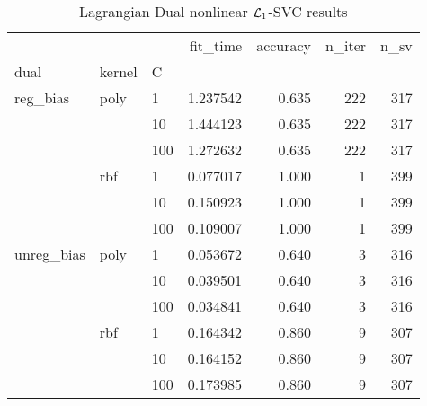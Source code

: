 \begin{table}[H]
\centering
\caption{Lagrangian Dual nonlinear $\protect \mathcal{L}_1$-SVC results}
\label{nonlinear_lagrangian_dual_l1_svc_cv_results}
\begin{tabular}{lllrrrr}
\toprule
           &     &     &  fit\_time &  accuracy &  n\_iter &  n\_sv \\
dual & kernel & C &           &           &         &       \\
\midrule
reg\_bias & poly & 1   &  1.237542 &     0.635 &     222 &   317 \\
           &     & 10  &  1.444123 &     0.635 &     222 &   317 \\
           &     & 100 &  1.272632 &     0.635 &     222 &   317 \\
           & rbf & 1   &  0.077017 &     1.000 &       1 &   399 \\
           &     & 10  &  0.150923 &     1.000 &       1 &   399 \\
           &     & 100 &  0.109007 &     1.000 &       1 &   399 \\
unreg\_bias & poly & 1   &  0.053672 &     0.640 &       3 &   316 \\
           &     & 10  &  0.039501 &     0.640 &       3 &   316 \\
           &     & 100 &  0.034841 &     0.640 &       3 &   316 \\
           & rbf & 1   &  0.164342 &     0.860 &       9 &   307 \\
           &     & 10  &  0.164152 &     0.860 &       9 &   307 \\
           &     & 100 &  0.173985 &     0.860 &       9 &   307 \\
\bottomrule
\end{tabular}
\end{table}
